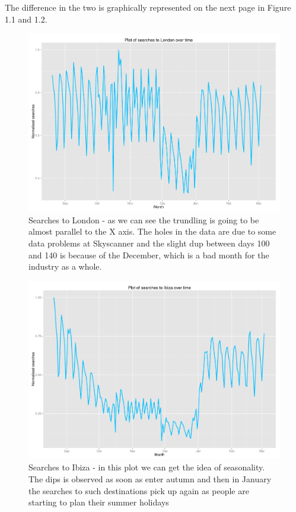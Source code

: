 \documentclass[minf,frontabs,twoside,singlespacing,parskip]{infthesis}
\begin{document}
The difference in the two is graphically represented on the next page in Figure 1.1 and 1.2. 


\begin{figure}[]
\begin{center}
\includegraphics[scale=0.4]{london-searches}
\end{center}
\caption{Searches to London - as we can see the trundling is going to be almost parallel to the X axis. The holes in the data are due to some data problems at Skyscanner and the slight dup between days 100 and 140 is because of the December, which is a bad month for the industry as a whole.}
\end{figure}


\begin{figure}[]
\begin{center}
\includegraphics[scale=0.4]{ibiza-searches}
\end{center}
\caption{Searches to Ibiza - in this plot we can get the idea of seasonality. The dips is observed as soon as enter autumn and then in January the searches to such destinations pick up again as people are starting to plan their summer holidays}
\end{figure}
\end{document}
